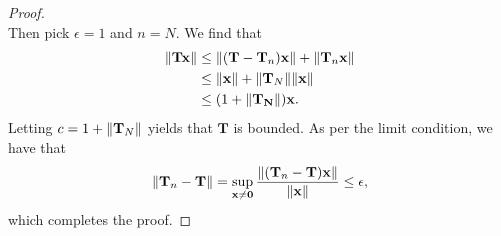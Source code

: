\documentclass[11pt]{article}
\renewcommand{\vec}[1]{\mathbf{#1}}
\newcommand{\mat}[1]{\mathbf{#1}}
\begin{document}
\begin{adjustwidth}{0.5cm}{}
\begin{proof}
\[    \]
    Then pick $\epsilon = 1$ and $n = N$. We find that
    \begin{align*}
      \norm{\mat{T} \vec{x}} & \le \norm{(\mat{T} - \mat{T}_{n}) \vec{x}} + \norm{\mat{T}_{n} \vec{x}} \\
                             & \le \norm{\vec{x}} + \norm{\mat{T}_{N}} \norm{\vec{x}} \\
                             & \le (1 + \norm{\mat{T_{N}}}) \vec{x}.
    \end{align*}
    Letting $c = 1 + \norm{\mat{T}_{N}}$ yields that $\mat{T}$ is bounded. As per the limit condition, we have that
    \[
      \norm{\mat{T}_{n} - \mat{T}} = \sup\limits_{\vec{x} \ne \vec{0}} \frac{\norm{(\mat{T}_{n} - \mat{T}) \vec{x}}}{\norm{\vec{x}}} \le \epsilon,
    \]
    which completes the proof.
  \end{proof}
\end{adjustwidth}

\end{document}
